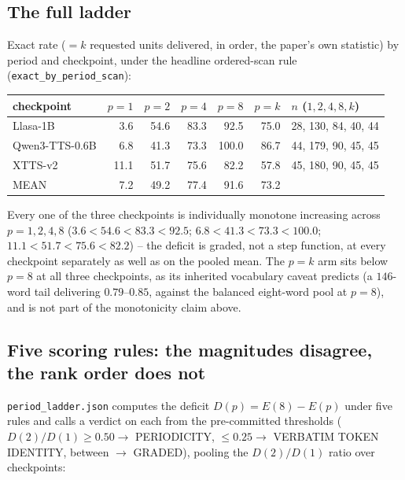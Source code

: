 \documentclass[11pt]{article}
\begin{document}
\subsection{The full ladder}

Exact rate ($=k$ requested units delivered, in order, the paper's own
statistic) by period and checkpoint, under the headline ordered-scan rule
(\texttt{exact\_by\_period\_scan}):

\begin{center}
\begin{tabular}{@{}lrrrrrl@{}}
\toprule
checkpoint & $p{=}1$ & $p{=}2$ & $p{=}4$ & $p{=}8$ & $p{=}k$ & $n$ ($1,2,4,8,k$) \\
\midrule
Llasa-1B         &  3.6 & 54.6 & 83.3 &  92.5 & 75.0 & 28, 130, 84, 40, 44 \\
Qwen3-TTS-0.6B   &  6.8 & 41.3 & 73.3 & 100.0 & 86.7 & 44, 179, 90, 45, 45 \\
XTTS-v2          & 11.1 & 51.7 & 75.6 &  82.2 & 57.8 & 45, 180, 90, 45, 45 \\
\midrule
MEAN             &  7.2 & 49.2 & 77.4 &  91.6 & 73.2 & \\
\bottomrule
\end{tabular}
\end{center}

\noindent Every one of the three checkpoints is individually monotone
increasing across $p=1,2,4,8$ ($3.6{<}54.6{<}83.3{<}92.5$;
$6.8{<}41.3{<}73.3{<}100.0$; $11.1{<}51.7{<}75.6{<}82.2$) -- the deficit is
graded, not a step function, at every checkpoint separately as well as on
the pooled mean. The $p=k$ arm sits below $p=8$ at all three checkpoints, as
its inherited vocabulary caveat predicts (a $146$-word tail delivering
$0.79$--$0.85$, against the balanced eight-word pool at $p=8$), and is not
part of the monotonicity claim above.

\subsection{Five scoring rules: the magnitudes disagree, the rank order does not}

\texttt{period\_ladder.json} computes the deficit
$D(p)=E(8)-E(p)$ under five rules and calls a verdict on each from the
pre-committed thresholds ($D(2)/D(1)\ge0.50\to$ PERIODICITY,
$\le0.25\to$ VERBATIM TOKEN IDENTITY, between $\to$ GRADED), pooling the
$D(2)/D(1)$ ratio over checkpoints:
\end{document}
